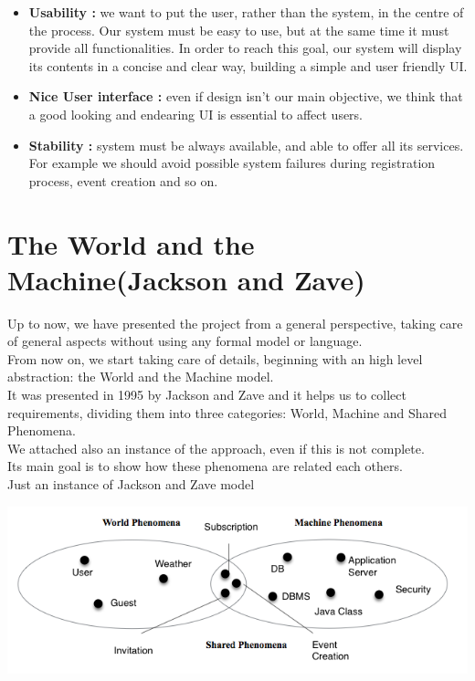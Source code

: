 \documentclass[12pt]{book}
\begin{document}
\begin{itemize}
	\item \textbf{Usability :} we want to put the user, rather than the system, in the centre of the process. Our system must be easy to use, but at the same time it must provide all functionalities. In order to reach this goal, our system will display its contents in a concise and clear way, building a simple and user friendly UI. \\ 
	\item \textbf{Nice User interface : } even if design isn't our main objective, we think that a good looking and endearing UI is essential to affect users.   \\
	\item \textbf{Stability : } system must be always available, and able to offer all its services. For example we should avoid possible system failures during registration process,  event creation and so on.\\
\end{itemize}

\section {The World and the Machine(Jackson and Zave)}
Up to now, we have presented the project from a general perspective, taking care of general aspects without using any formal model or language. \\ From now on, we start taking care of details, beginning with an high level abstraction: the World and the Machine model. \\ It was presented in 1995 by Jackson and Zave and it helps us to collect requirements, dividing them into three categories: World, Machine and Shared Phenomena. \\
We attached also an instance of the approach, even if this is not complete.\\ Its main goal is to show how these phenomena are related each others. \\

Just an instance of Jackson and Zave model\\
\begin{center}
\includegraphics[scale=0.6]{JZ}
\end{center}
\end{document}
